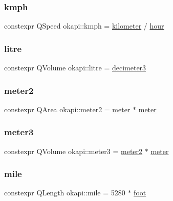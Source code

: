 \subsubsection{\texorpdfstring{kmph}{kmph}}
{\footnotesize\ttfamily constexpr Q\+Speed okapi\+::kmph = \mbox{\hyperlink{namespaceokapi_a05acd5fc8bdc7fe19d03a5241ae4bbc7}{kilometer}} / \mbox{\hyperlink{namespaceokapi_a43d321d318cb594798b60a6be26e85ce}{hour}}}

\mbox{\label{namespaceokapi_a877d0e470662f3b0ed2525af2740a761}} 
\subsubsection{\texorpdfstring{litre}{litre}}
{\footnotesize\ttfamily constexpr Q\+Volume okapi\+::litre = \mbox{\hyperlink{namespaceokapi_a4f07207ec37be4257d882710d97a3de9}{decimeter3}}}

\mbox{\label{namespaceokapi_af408c7a86b7f54691246722841817248}} 
\subsubsection{\texorpdfstring{meter2}{meter2}}
{\footnotesize\ttfamily constexpr Q\+Area okapi\+::meter2 = \mbox{\hyperlink{namespaceokapi_a59563b3d4b18633f1c8d852e2932d1db}{meter}} $\ast$ \mbox{\hyperlink{namespaceokapi_a59563b3d4b18633f1c8d852e2932d1db}{meter}}}

\mbox{\label{namespaceokapi_af0b912fc89f2fb06960a683d9894df1f}} 
\subsubsection{\texorpdfstring{meter3}{meter3}}
{\footnotesize\ttfamily constexpr Q\+Volume okapi\+::meter3 = \mbox{\hyperlink{namespaceokapi_af408c7a86b7f54691246722841817248}{meter2}} $\ast$ \mbox{\hyperlink{namespaceokapi_a59563b3d4b18633f1c8d852e2932d1db}{meter}}}

\mbox{\label{namespaceokapi_adb797d6d549d23e9b2e6c817a07ddfba}} 
\subsubsection{\texorpdfstring{mile}{mile}}
{\footnotesize\ttfamily constexpr Q\+Length okapi\+::mile = 5280 $\ast$ \mbox{\hyperlink{namespaceokapi_a76974d5bf7ed9473b2d59153894a8587}{foot}}}

